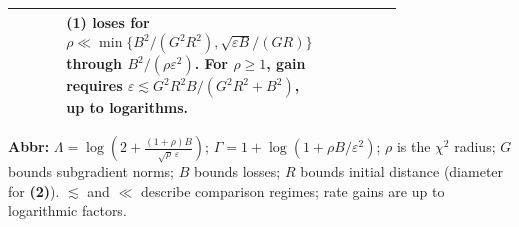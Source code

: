 \begin{table}[tp]
\begin{threeparttable}
\begin{tabularx}{\linewidth}{@{}>{\raggedright\arraybackslash}p{0.20\linewidth}>{\raggedright\arraybackslash}p{0.32\linewidth}>{\raggedright\arraybackslash}p{0.25\linewidth}>{\raggedright\arraybackslash}X@{}}
& \textbf{(1)} loses for $\rho\ll\min\{B^2/(G^2R^2),\allowbreak\sqrt{\varepsilon B}/(GR)\}$ through $B^2/(\rho\varepsilon^2)$. For $\rho\ge1$, gain requires $\varepsilon\lesssim G^2R^2B/(G^2R^2+B^2)$, up to logarithms. \\
\bottomrule
\end{tabularx}
\begin{tablenotes}[flushleft]\footnotesize
\item[] \textbf{Abbr:} $\Lambda=\log\!\left(2+\frac{(1+\rho)B}{\sqrt\rho\,\varepsilon}\right)$; $\Gamma=1+\log(1+\rho B/\varepsilon^2)$; $\rho$ is the $\chi^2$ radius; $G$ bounds subgradient norms; $B$ bounds losses; $R$ bounds initial distance (diameter for \textbf{(2)}). $\lesssim$ and $\ll$ describe comparison regimes; rate gains are up to logarithmic factors.
\end{tablenotes}
\end{threeparttable}
\end{table}
\clearpage
